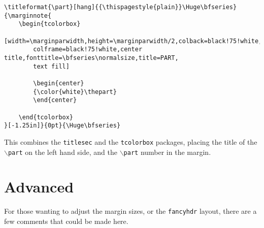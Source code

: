 \documentclass[10pt]{article}
\begin{document}
	\begin{fullpage}
	\begin{lstlisting}
\titleformat{\part}[hang]{{\thispagestyle{plain}}\Huge\bfseries}{\marginnote{
	\begin{tcolorbox}
	[width=\marginparwidth,height=\marginparwidth/2,colback=black!75!white,
		colframe=black!75!white,center title,fonttitle=\bfseries\normalsize,title=PART,
		text fill]

		\begin{center}
		{\color{white}\thepart}
		\end{center}

	\end{tcolorbox}
}[-1.25in]}{0pt}{\Huge\bfseries}
	\end{lstlisting}
	\end{fullpage}

	This combines the \texttt{titlesec} and the \texttt{tcolorbox} packages, placing the title of the \texttt{$\backslash$part} on the left hand side, and the \texttt{$\backslash$part} number in the margin.


	\part{Advanced}
	For those wanting to adjust the margin sizes, or the \texttt{fancyhdr} layout, there are a few comments that could be made here.
\end{document}
